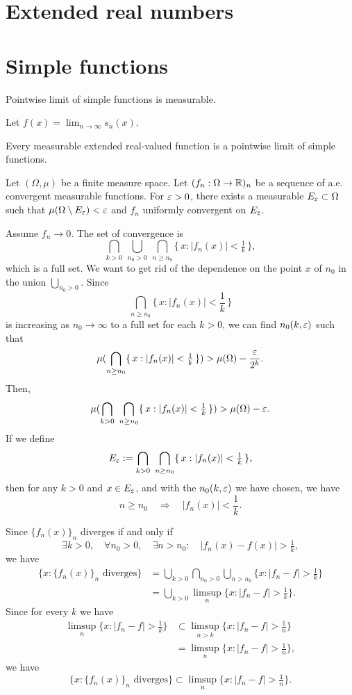 \documentclass{../note}
\begin{document}
\section{Extended real numbers}


\section{Simple functions}
Pointwise limit of simple functions is measurable.
\begin{pf}
Let $f(x)=\lim_{n\to\infty}s_n(x)$.

\end{pf}

Every measurable extended real-valued function is a pointwise limit of simple functions.





\begin{prb}
Let $(\Omega,\mu)$ be a finite measure space.
Let $(f_n:\Omega\to\mathbb{R})_n$ be a sequence of a.e. convergent measurable functions.
For $\varepsilon>0$, there exists a measurable $E_\varepsilon\subset\Omega$ such that $\mu(\Omega\setminus E_\varepsilon)<\varepsilon$ and $f_n$ uniformly convergent on $E_\varepsilon$.
\end{prb}
\begin{pf}
Assume $f_n\to0$.
The set of convergence is
\[\bigcap_{k>0}\ \bigcup_{n_0>0}\ \bigcap_{n\ge n_0}\{\,x:|f_n(x)|<\tfrac1k\,\},\]
which is a full set.
We want to get rid of the dependence on the point $x$ of $n_0$ in the union $\bigcup_{n_0>0}$.
Since
\[\bigcap_{n\ge n_0}\{\,x:|f_n(x)|<\frac1k\,\}\]
is increasing as $n_0\to\infty$ to a full set for each $k>0$, we can find $n_0(k,\varepsilon)$ such that
\[\mu(\bigcap_{n\ge n_0}\{\,x:|f_n(x)|<\tfrac1k\,\})>\mu(\Omega)-\frac{\varepsilon}{2^k}.\]
Then,
\[\mu(\bigcap_{k>0}\ \bigcap_{n\ge n_0}\{\,x:|f_n(x)|<\tfrac1k\,\})>\mu(\Omega)-\varepsilon.\]
If we define
\[E_\e:=\bigcap_{k>0}\ \bigcap_{n\ge n_0}\{\,x:|f_n(x)|<\tfrac1k\,\},\]
then for any $k>0$ and $x\in E_\varepsilon$, and with the $n_0(k,\varepsilon)$ we have chosen,
we have
\[n\ge n_0\quad\Rightarrow\quad |f_n(x)|<\frac1k.\]
\end{pf}



Since $\{f_n(x)\}_n$ diverges if and only if
\[\exists k>0,\quad\forall n_0>0,\quad\exists n>n_0:\quad|f_n(x)-f(x)|>\tfrac1k,\]
we have
\begin{align*}
\{x:\{f_n(x)\}_n\text{ diverges}\}
&=\bigcup_{k>0}\bigcap_{n_0>0}\bigcup_{n>n_0}\{x:|f_n-f|>\tfrac1k\}\\
&=\bigcup_{k>0}\limsup_n\{x:|f_n-f|>\tfrac1k\}.
\end{align*}
Since for every $k$ we have
\begin{align*}
\limsup_n\{x:|f_n-f|>\tfrac1k\}
&\subset\limsup_{n>k}\{x:|f_n-f|>\tfrac1n\}\\
&=\limsup_n\{x:|f_n-f|>\tfrac1n\},
\end{align*}
we have
\[\{x:\{f_n(x)\}_n\text{ diverges}\}\subset\limsup_n\{x:|f_n-f|>\tfrac1n\}.\]
\end{document}
